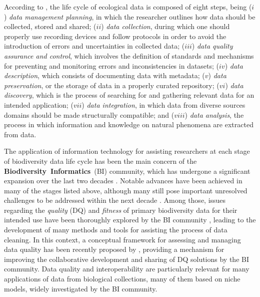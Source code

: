 According to , the life cycle of ecological data is composed of eight steps, being 
($i$) \textit{data management planning}, in which the researcher outlines how data should be collected, stored and shared;
($ii$) \textit{data collection}, during which one should properly use recording devices and follow protocols in order to avoid the introduction of errors and uncertainties in collected data;
($iii$) \textit{data quality assurance and control}, which involves the definition of standards and mechanisms for preventing and monitoring errors and inconsistencies in datasets;
($iv$) \textit{data description}, which consists of documenting data with metadata;
($v$) \textit{data preservation}, or the storage of data in a properly curated repository;
($vi$) \textit{data discovery}, which is the process of searching for and gathering relevant data for an intended application;
($vii$) \textit{data integration}, in which data from diverse sources domains should be made structurally compatible; and
($viii$) \textit{data analysis}, the process in which information and knowledge on natural phenomena are extracted from data.

The application of information technology for assisting researchers at each stage of biodiversity data life cycle has been the main concern of the \textbf{Biodiversity~Informatics}~(BI) community, which has undergone a significant expansion over the last two decades \cite{Soberon2004}.
Notable advances have been achieved in many of the stages listed above, although many still pose important unresolved challenges to be addressed within the next decade \cite{Peterson2015}.
%
Among those, issues regarding the \textit{quality} (DQ) and \textit{fitness} of primary biodiversity data for their intended use have been thoroughly explored by the BI community \cite{Chapman2005a}, leading to the development of many methods and tools for assisting the process of data cleaning. 
In this context, a conceptual framework for assessing and managing data quality has been recently proposed by , providing a mechanism for improving the collaborative development and sharing of DQ solutions by the BI community.
%
%
Data quality and interoperability are particularly relevant for many applications of data from biological collections, many of them based on niche models, widely investigated by the BI community.



